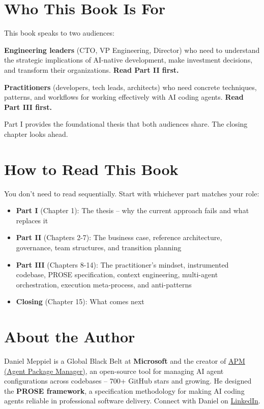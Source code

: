 \documentclass[
  a4paper,
  DIV=11,
  numbers=noendperiod]{scrreprt}
\providecommand{\tightlist}{%
  \setlength{\itemsep}{0pt}\setlength{\parskip}{0pt}}
\begin{document}
\section{Who This Book Is For}\label{who-this-book-is-for}

This book speaks to two audiences:

\textbf{Engineering leaders} (CTO, VP Engineering, Director) who need to
understand the strategic implications of AI-native development, make
investment decisions, and transform their organizations. \textbf{Read
Part II first.}

\textbf{Practitioners} (developers, tech leads, architects) who need
concrete techniques, patterns, and workflows for working effectively
with AI coding agents. \textbf{Read Part III first.}

Part I provides the foundational thesis that both audiences share. The
closing chapter looks ahead.

\section{How to Read This Book}\label{how-to-read-this-book}

You don't need to read sequentially. Start with whichever part matches
your role:

\begin{itemize}
\tightlist
\item
  \textbf{Part I} (Chapter 1): The thesis -- why the current approach
  fails and what replaces it
\item
  \textbf{Part II} (Chapters 2-7): The business case, reference
  architecture, governance, team structures, and transition planning
\item
  \textbf{Part III} (Chapters 8-14): The practitioner's mindset,
  instrumented codebase, PROSE specification, context engineering,
  multi-agent orchestration, execution meta-process, and anti-patterns
\item
  \textbf{Closing} (Chapter 15): What comes next
\end{itemize}

\section{About the Author}\label{about-the-author}

Daniel Meppiel is a Global Black Belt at \textbf{Microsoft} and the
creator of \href{https://github.com/microsoft/apm}{APM (Agent Package
Manager)}, an open-source tool for managing AI agent configurations
across codebases -- 700+ GitHub stars and growing. He designed the
\textbf{PROSE framework}, a specification methodology for making AI
coding agents reliable in professional software delivery. Connect with
Daniel on \href{https://www.linkedin.com/in/danielmeppiel/}{LinkedIn}.
\end{document}
